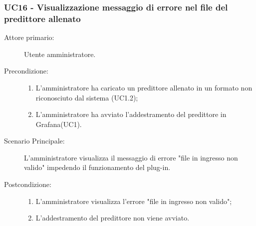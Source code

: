 \subsubsection{UC16 - Visualizzazione messaggio di errore nel file del predittore allenato}
\label{sssec:uc16}
\begin{description}
	\item[Attore primario:] Utente amministratore.
	\item[Precondizione:]
	\begin{enumerate}
		\item L'amministratore ha caricato un predittore allenato in un formato non riconosciuto dal sistema (UC1.2);
		\item L'amministratore ha avviato l'addestramento del predittore in Grafana(UC1).
	\end{enumerate}
	\item[Scenario Principale:] L'amministratore visualizza il messaggio di errore "file in ingresso non valido" impedendo il funzionamento del plug-in.
	\item[Postcondizione:]
	\begin{enumerate}
		\item L'amministratore visualizza l'errore "file in ingresso non valido";
		\item L'addestramento del predittore non viene avviato.
	\end{enumerate}
\end{description}
